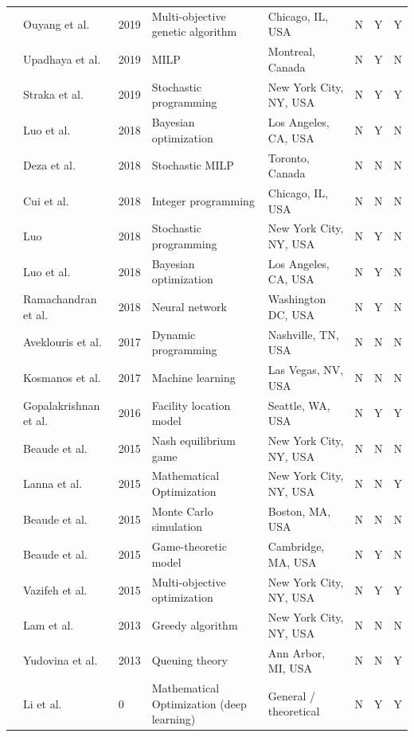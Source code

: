 \documentclass[letterpaper, 12pt, oneside, doublespacing]{Thesis}
\begin{document}
\begin{longtable}{L{0.9cm} L{1.8cm} L{0.7cm} L{2.5cm} L{2.1cm} L{0.7cm} L{0.7cm} L{0.7cm}}
\cite{a_method_2019} & Ouyang et al. & 2019 & Multi-objective genetic algorithm & Chicago, IL, USA & N & Y & Y \\
\cite{optimal_decision_2019} & Upadhaya et al. & 2019 & MILP & Montreal, Canada & N & Y & N \\
\cite{predicting_popularity_2019} & Straka et al. & 2019 & Stochastic programming & New York City, NY, USA & N & Y & Y \\
\cite{a_consumer_2018} & Luo et al. & 2018 & Bayesian optimization & Los Angeles, CA, USA & N & Y & N \\
\cite{charging_station_2018} & Deza et al. & 2018 & Stochastic MILP & Toronto, Canada & N & N & N \\
\cite{electric_vehicle_2018} & Cui et al. & 2018 & Integer programming & Chicago, IL, USA & N & N & N \\
\cite{engineering_and_2018} & Luo & 2018 & Stochastic programming & New York City, NY, USA & N & Y & N \\
\cite{placement_of_2018} & Luo et al. & 2018 & Bayesian optimization & Los Angeles, CA, USA & N & Y & N \\
\cite{predicting_electric_2018} & Ramachandran et al. & 2018 & Neural network & Washington DC, USA & N & Y & N \\
\cite{electric_vehicle_2017} & Aveklouris et al. & 2017 & Dynamic programming & Nashville, TN, USA & N & N & N \\
\cite{route_optimization_2017} & Kosmanos et al. & 2017 & Machine learning & Las Vegas, NV, USA & N & N & N \\
\cite{demand_prediction_2016} & Gopalakrishnan et al. & 2016 & Facility location model & Seattle, WA, USA & N & Y & Y \\
\cite{charging_games_2015} & Beaude et al. & 2015 & Nash equilibrium game & New York City, NY, USA & N & N & N \\
\cite{electric_vehicles_2015} & Lanna et al. & 2015 & Mathematical Optimization & New York City, NY, USA & N & N & Y \\
\cite{introducing_decentralized_2015} & Beaude et al. & 2015 & Monte Carlo simulation & Boston, MA, USA & N & N & N \\
\cite{minimizing_the_2015} & Beaude et al. & 2015 & Game-theoretic model & Cambridge, MA, USA & N & Y & N \\
\cite{optimizing_the_2015} & Vazifeh et al. & 2015 & Multi-objective optimization & New York City, NY, USA & N & Y & Y \\
\cite{electric_vehicle_2013} & Lam et al. & 2013 & Greedy algorithm & New York City, NY, USA & N & N & N \\
\cite{socially_optimal_2013} & Yudovina et al. & 2013 & Queuing theory & Ann Arbor, MI, USA & N & N & Y \\
\cite{electric_vehicle_0} & Li et al. & 0 & Mathematical Optimization (deep learning) & General {\slash} theoretical & N & Y & Y \\
\bottomrule
\end{longtable}
\end{document}
